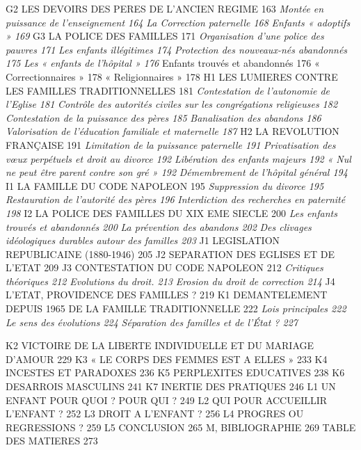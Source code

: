 G2 LES DEVOIRS DES PERES DE L'ANCIEN REGIME	163
 \emph{Montée en puissance de l'enseignement	164}
 \emph{La Correction paternelle	168}
 \emph{Enfants « adoptifs »	169}
G3 LA POLICE DES FAMILLES	171
 \emph{Organisation d'une police des pauvres	171}
 \emph{Les enfants illégitimes	174}
 \emph{Protection des nouveaux-nés abandonnés	175}
 \emph{Les « enfants de l'hôpital »	176}
 Enfants trouvés et abandonnés	176
 « Correctionnaires »	178
 « Religionnaires »	178
H1 LES LUMIERES CONTRE LES FAMILLES TRADITIONNELLES	181
 \emph{Contestation de l'autonomie de l'Eglise	181}
 \emph{Contrôle des autorités civiles sur les congrégations religieuses	182}
 \emph{Contestation de la puissance des pères	185}
 \emph{Banalisation des abandons	186}
 \emph{Valorisation de l'éducation familiale et maternelle	187}
H2 LA REVOLUTION FRANÇAISE	191
 \emph{Limitation de la puissance paternelle	191}
 \emph{Privatisation des vœux perpétuels et droit au divorce	192}
 \emph{Libération des enfants majeurs	192}
 \emph{« Nul ne peut être parent contre son gré »	192}
 \emph{Démembrement de l'hôpital général	194}
I1 LA FAMILLE DU CODE NAPOLEON	195
 \emph{Suppression du divorce	195}
 \emph{Restauration de l'autorité des pères	196}
 \emph{Interdiction des recherches en paternité	198}
I2 LA POLICE DES FAMILLES DU XIX EME SIECLE	200
 \emph{Les enfants trouvés et abandonnés	200}
 \emph{La prévention des abandons	202}
 \emph{Des clivages idéologiques durables autour des familles	203}
J1 LEGISLATION REPUBLICAINE (1880-1946)	205
J2 SEPARATION DES EGLISES ET DE L'ETAT	209
J3 CONTESTATION DU CODE NAPOLEON	212
 \emph{Critiques théoriques	212}
 \emph{Evolutions du droit.	213}
 \emph{Erosion du droit de correction	214}
J4 L'ETAT, PROVIDENCE DES FAMILLES ?	219
K1 DEMANTELEMENT DEPUIS 1965 DE LA FAMILLE TRADITIONNELLE	222
 \emph{Lois principales	222}
 \emph{Le sens des évolutions	224}
 \emph{Séparation des familles et de l'État ?	227
}
 
K2 VICTOIRE DE LA LIBERTE INDIVIDUELLE ET DU MARIAGE D'AMOUR	229
K3 « LE CORPS DES FEMMES EST A ELLES »	233
K4 INCESTES ET PARADOXES	236
K5 PERPLEXITES EDUCATIVES	238
K6 DESARROIS MASCULINS	241
K7 INERTIE DES PRATIQUES	246
L1 UN ENFANT POUR QUOI ? POUR QUI ?	249
L2 QUI POUR ACCUEILLIR L'ENFANT ?	252
L3 DROIT A L'ENFANT ?	256
L4 PROGRES OU REGRESSIONS ?	259
L5 CONCLUSION	265
M, BIBLIOGRAPHIE	269
TABLE DES MATIERES	273